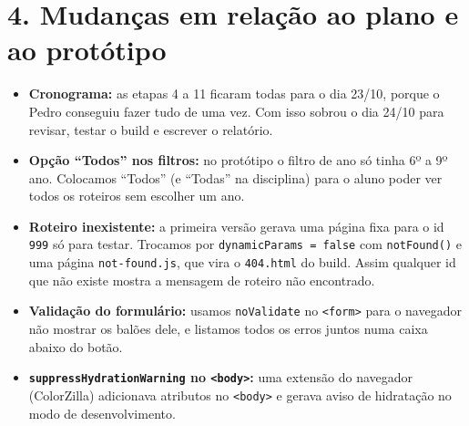 \documentclass[10pt,a4paper]{article}
\begin{document}
\section*{4. Mudanças em relação ao plano e ao protótipo}
\begin{itemize}
    \item \textbf{Cronograma:} as etapas 4 a 11 ficaram todas para o dia 23/10, porque o Pedro conseguiu fazer tudo de uma vez. Com isso sobrou o dia 24/10 para revisar, testar o build e escrever o relatório.
    \item \textbf{Opção ``Todos'' nos filtros:} no protótipo o filtro de ano só tinha 6º a 9º ano. Colocamos ``Todos'' (e ``Todas'' na disciplina) para o aluno poder ver todos os roteiros sem escolher um ano.
    \item \textbf{Roteiro inexistente:} a primeira versão gerava uma página fixa para o id \texttt{999} só para testar. Trocamos por \texttt{dynamicParams = false} com \texttt{notFound()} e uma página \texttt{not-found.js}, que vira o \texttt{404.html} do build. Assim qualquer id que não existe mostra a mensagem de roteiro não encontrado.
    \item \textbf{Validação do formulário:} usamos \texttt{noValidate} no \texttt{<form>} para o navegador não mostrar os balões dele, e listamos todos os erros juntos numa caixa abaixo do botão.
    \item \textbf{\texttt{suppressHydrationWarning} no \texttt{<body>}:} uma extensão do navegador (ColorZilla) adicionava atributos no \texttt{<body>} e gerava aviso de hidratação no modo de desenvolvimento.
\end{itemize}
\end{document}
